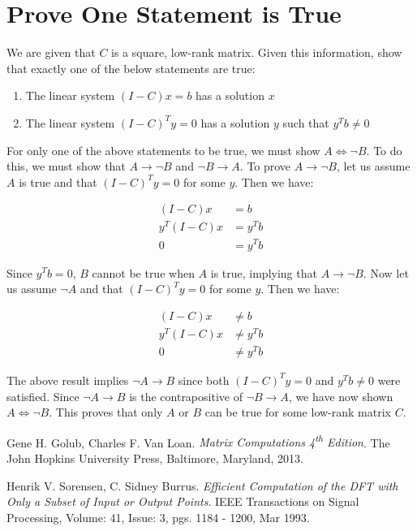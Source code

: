 \documentclass{article}[11pt]
\begin{document}
   \newpage
   \section{Prove One Statement is True}
   We are given that $C$ is a square, low-rank matrix. Given this information, show that exactly one of the below statements are true:
   
   \begin{enumerate}[label=(\Alph*)]
   \item The linear system $(I-C)x = b$ has a solution $x$
   \item The linear system $(I-C)^Ty = 0$ has a solution $y$ such that $y^Tb \neq 0$
   \end{enumerate}
   
   For only one of the above statements to be true, we must show $A \iff \neg B$. To do this, we must show that $A \rightarrow \neg B$ and $\neg B \rightarrow A$. To prove $A \rightarrow \neg B$, let us assume $A$ is true and that $(I-C)^Ty = 0$ for some $y$. Then we have:
   
   \begin{align*}
   (I-C)x &= b \\
   y^T(I - C)x &= y^Tb \\
   0 &= y^Tb
   \end{align*}
   
   Since $y^Tb = 0$, $B$ cannot be true when $A$ is true, implying that $A \rightarrow \neg B$. Now let us assume $\neg A$ and that $(I-C)^Ty = 0$ for some $y$. Then we have:
   
   \begin{align*}
   (I-C)x &\neq b \\
   y^T(I-C)x & \neq y^Tb  \\
   0 &\neq  y^Tb
   \end{align*}
   
   The above result implies $\neg  A \rightarrow B$ since both $(I-C)^Ty = 0$ and $y^Tb \neq 0$ were satisfied. Since $\neg A \rightarrow B$ is the contrapositive of $\neg B \rightarrow A$, we have now shown $ A \iff \neg B$. This proves that only $A$ or $B$ can be true for some low-rank matrix $C$.
   
   
   
\begin{thebibliography}{9}
Gene H. Golub, Charles F. Van Loan. 
\textit{Matrix Computations 4\textsuperscript{th} Edition}. 
The John Hopkins University Press, Baltimore, Maryland, 2013.
 
Henrik V. Sorensen, C. Sidney Burrus.
\textit{Efficient Computation of the DFT with Only a Subset of Input or Output Points}.
IEEE Transactions on Signal Processing, Volume: 41, Issue: 3, pgs. 1184 - 1200, Mar 1993.
\end{thebibliography}
\end{document}
